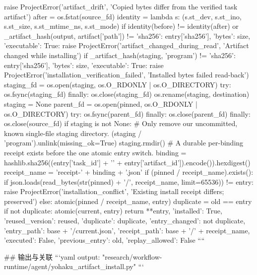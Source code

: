                     raise ProjectError('artifact_drift', 'Copied bytes differ from the verified task artifact')
                after = os.fstat(source_fd)
                identity = lambda s: (s.st_dev, s.st_ino, s.st_size, s.st_mtime_ns, s.st_mode)
                if identity(before) != identity(after) or _artifact_hash(output, artifact['path']) != {
                        'sha256': entry['sha256'], 'bytes': size, 'executable': True}:
                    raise ProjectError('artifact_changed_during_read', 'Artifact changed while installing')
                if _artifact_hash(staging, 'program') != {'sha256': entry['sha256'], 'bytes': size, 'executable': True}:
                    raise ProjectError('installation_verification_failed', 'Installed bytes failed read-back')
                staging_fd = os.open(staging, os.O_RDONLY | os.O_DIRECTORY)
                try:
                    os.fsync(staging_fd)
                finally:
                    os.close(staging_fd)
                os.rename(staging, destination)
                staging = None
                parent_fd = os.open(pinned, os.O_RDONLY | os.O_DIRECTORY)
                try:
                    os.fsync(parent_fd)
                finally:
                    os.close(parent_fd)
            finally:
                os.close(source_fd)
                if staging is not None:
                    # Only remove our uncommitted, known single-file staging directory.
                    (staging / 'program').unlink(missing_ok=True)
                    staging.rmdir()
        # A durable per-binding receipt exists before the one atomic entry switch.
        binding = hashlib.sha256((entry['task_id'] + '\0' + entry['artifact_id']).encode()).hexdigest()
        receipt_name = 'receipt-' + binding + '.json'
        if (pinned / receipt_name).exists():
            if json.loads(read_bytes(str(pinned) + '/', receipt_name, limit=65536)) != entry:
                raise ProjectError('installation_conflict', 'Existing install receipt differs; preserved')
        else:
            atomic(pinned / receipt_name, entry)
        duplicate = old == entry
        if not duplicate:
            atomic(current, entry)
        return {**entry, 'installed': True, 'reused_version': reused, 'duplicate': duplicate,
                'entry_changed': not duplicate, 'entry_path': base + '/current.json',
                'receipt_path': base + '/' + receipt_name, 'executed': False,
                'previous_entry': old, 'replay_allowed': False}
````

## 输出与关联
```yaml
output: "research/workflow-runtime/agent/yohaku_artifact_install.py"
```
